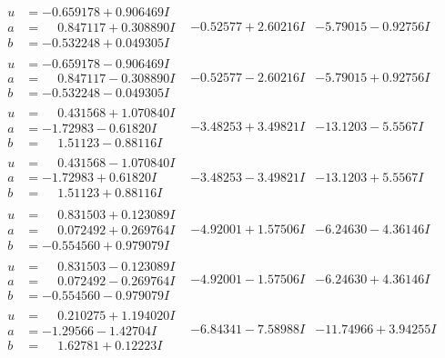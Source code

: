 \documentclass[1p]{elsarticle_modified}
\theoremstyle{definition}
\begin{document}
$$\begin{array}{c|c|c}
\begin{aligned}
u &= -0.659178 + 0.906469 I \\
a &= \phantom{-}0.847117 + 0.308890 I \\
b &= -0.532248 + 0.049305 I\end{aligned}
 & -0.52577 + 2.60216 I & -5.79015 - 0.92756 I \\ \hline\begin{aligned}
u &= -0.659178 - 0.906469 I \\
a &= \phantom{-}0.847117 - 0.308890 I \\
b &= -0.532248 - 0.049305 I\end{aligned}
 & -0.52577 - 2.60216 I & -5.79015 + 0.92756 I \\ \hline\begin{aligned}
u &= \phantom{-}0.431568 + 1.070840 I \\
a &= -1.72983 - 0.61820 I \\
b &= \phantom{-}1.51123 - 0.88116 I\end{aligned}
 & -3.48253 + 3.49821 I & -13.1203 - 5.5567 I \\ \hline\begin{aligned}
u &= \phantom{-}0.431568 - 1.070840 I \\
a &= -1.72983 + 0.61820 I \\
b &= \phantom{-}1.51123 + 0.88116 I\end{aligned}
 & -3.48253 - 3.49821 I & -13.1203 + 5.5567 I \\ \hline\begin{aligned}
u &= \phantom{-}0.831503 + 0.123089 I \\
a &= \phantom{-}0.072492 + 0.269764 I \\
b &= -0.554560 + 0.979079 I\end{aligned}
 & -4.92001 + 1.57506 I & -6.24630 - 4.36146 I \\ \hline\begin{aligned}
u &= \phantom{-}0.831503 - 0.123089 I \\
a &= \phantom{-}0.072492 - 0.269764 I \\
b &= -0.554560 - 0.979079 I\end{aligned}
 & -4.92001 - 1.57506 I & -6.24630 + 4.36146 I \\ \hline\begin{aligned}
u &= \phantom{-}0.210275 + 1.194020 I \\
a &= -1.29566 - 1.42704 I \\
b &= \phantom{-}1.62781 + 0.12223 I\end{aligned}
 & -6.84341 - 7.58988 I & -11.74966 + 3.94255 I \\ \hline\begin{aligned}

\end{aligned}
\end{array}$$
\end{document}
